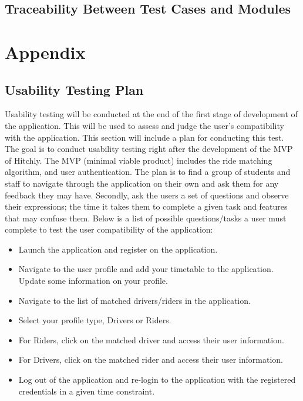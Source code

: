 \documentclass[12pt, titlepage]{article}
\begin{document}
\subsection{Traceability Between Test Cases and Modules}

				




\newpage

\section{Appendix}

\subsection{Usability Testing Plan}
Usability testing will be conducted at the end of the first stage of development of the application. This will be used to assess and judge the user's compatibility with the application. This section will include a plan for conducting this test. 
\\
The goal is to conduct usability testing right after the development of the MVP of Hitchly. The MVP (minimal viable product) includes the ride matching algorithm, and user authentication. The plan is to find a group of students and staff to navigate through the application on their own and ask them for any feedback they may have. Secondly, ask the users a set of questions and observe their expressions; the time it takes them to complete a given task and features that may confuse them.  Below is a list of possible questions/tasks a user must complete to test the user compatibility of the application: 

\begin{itemize}
    \item Launch the application and register on the application.  
    \item Navigate to the user profile and add your timetable to the application. Update some information on your profile. 
    \item Navigate to the list of matched drivers/riders in the application.
    \item Select your profile type, Drivers or Riders.
    \item For Riders, click on the matched driver and access their user information.
    \item For Drivers, click on the matched rider and access their user information.
    \item Log out of the application and re-login to the application with the registered credentials in a given time constraint. 
\end{itemize}
\end{document}

